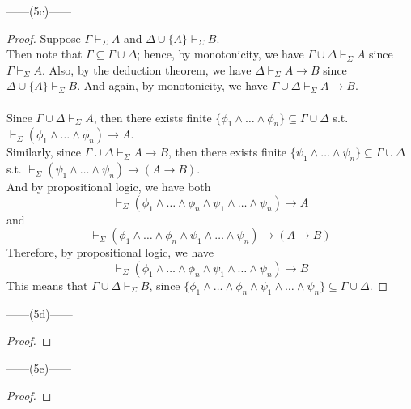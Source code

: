 \documentclass[12pt]{article}
\newcommand{\dr}{\vdash_{\Sigma}}
\begin{document}
\noindent
\begin{center}
    ------(5c)------
\end{center} 
\begin{proof}
    Suppose $\Gamma \dr A$ and $\Delta \cup \{A\} \dr B$.\\
    Then note that $\Gamma \subseteq \Gamma \cup \Delta$; hence, by monotonicity, we have $\Gamma \cup \Delta \dr A$ since $\Gamma \dr A$.
    Also, by the deduction theorem, we have $\Delta \dr A \to B$ since $\Delta \cup \{A\} \dr B$.
    And again, by monotonicity, we have $\Gamma \cup \Delta \dr A \to B$.\\
    \\
    Since $\Gamma \cup \Delta \dr A$, then there exists finite $\{\phi_1 \land \dots \land \phi_n\} \subseteq \Gamma \cup \Delta$ s.t. $\dr (\phi_1 \land \dots \land \phi_n) \to A$.\\
    Similarly, since $\Gamma \cup \Delta \dr A \to B$, then there exists finite $\{\psi_1 \land \dots \land \psi_n\} \subseteq \Gamma \cup \Delta$ s.t. $\dr (\psi_1 \land \dots \land \psi_n) \to (A \to B)$.\\
    And by propositional logic, we have both
    $$\dr (\phi_1 \land \dots \land \phi_n \land \psi_1 \land \dots \land \psi_n) \to A$$ and
    $$\dr (\phi_1 \land \dots \land \phi_n \land \psi_1 \land \dots \land \psi_n) \to (A \to B)$$
    Therefore, by propositional logic, we have
    $$\dr (\phi_1 \land \dots \land \phi_n \land \psi_1 \land \dots \land \psi_n) \to B$$
    This means that $\Gamma \cup \Delta \dr B$, since $\{\phi_1 \land \dots \land \phi_n \land \psi_1 \land \dots \land \psi_n\} \subseteq \Gamma \cup \Delta$.
\end{proof}

\noindent
\begin{center}
    ------(5d)------
\end{center} 
\begin{proof}
    
\end{proof}

\noindent
\begin{center}
    ------(5e)------
\end{center} 
\begin{proof}
    
\end{proof}
\end{document}
